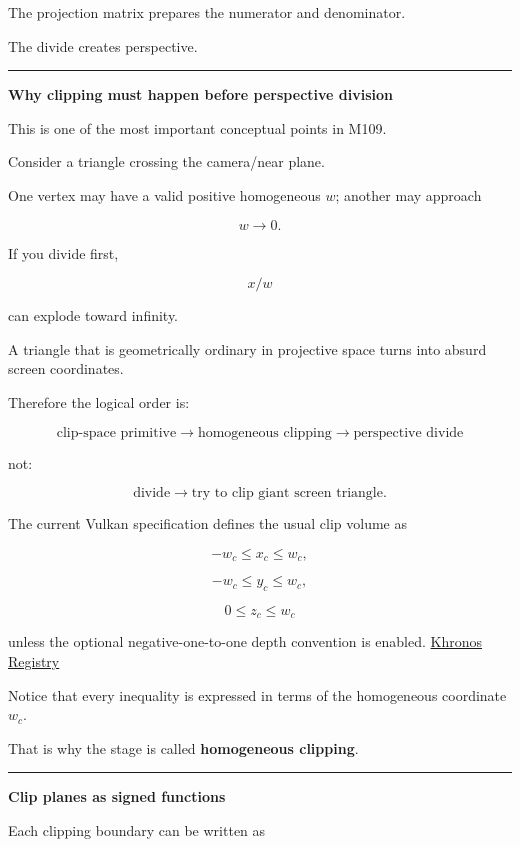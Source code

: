 The projection matrix prepares the numerator and denominator.

The divide creates perspective.

\begin{center}\rule{0.5\linewidth}{0.5pt}\end{center}

\textbf{Why clipping must happen before perspective division}

This is one of the most important conceptual points in M109.

Consider a triangle crossing the camera/near plane.

One vertex may have a valid positive homogeneous \(w\); another may approach

\[
w\rightarrow0.
\]

If you divide first,

\[
x/w
\]

can explode toward infinity.

A triangle that is geometrically ordinary in projective space turns into absurd screen coordinates.

Therefore the logical order is:

\[
\boxed{
\text{clip-space primitive}
\rightarrow
\text{homogeneous clipping}
\rightarrow
\text{perspective divide}
}
\]

not:

\[
\text{divide}
\rightarrow
\text{try to clip giant screen triangle}.
\]

The current Vulkan specification defines the usual clip volume as

\[
-w_c\le x_c\le w_c,
\]

\[
-w_c\le y_c\le w_c,
\]

\[
0\le z_c\le w_c
\]

unless the optional negative-one-to-one depth convention is enabled. \href{https://registry.khronos.org/vulkan/specs/latest-ratified/pdf/vkspec.pdf?utm_source=chatgpt.com}{Khronos Registry}

Notice that every inequality is expressed in terms of the homogeneous coordinate \(w_c\).

That is why the stage is called \textbf{homogeneous clipping}.

\begin{center}\rule{0.5\linewidth}{0.5pt}\end{center}

\textbf{Clip planes as signed functions}

Each clipping boundary can be written as

